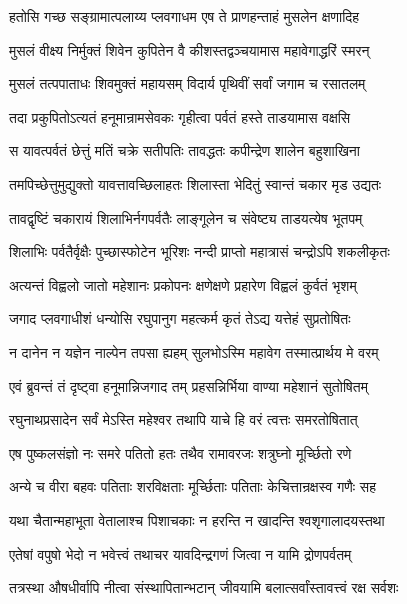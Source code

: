 \twolineshloka
{हतोसि गच्छ सङ्ग्रामात्पलाय्य प्लवगाधम}
{एष ते प्राणहन्ताहं मुसलेन क्षणादिह}%

\twolineshloka
{मुसलं वीक्ष्य निर्मुक्तं शिवेन कुपितेन वै}
{कीशस्तद्वञ्चयामास महावेगाद्धरिं स्मरन्}%

\twolineshloka
{मुसलं तत्पपाताधः शिवमुक्तं महायसम्}
{विदार्य पृथिवीं सर्वां जगाम च रसातलम्}%

\twolineshloka
{तदा प्रकुपितोऽत्यतं हनूमान्रामसेवकः}
{गृहीत्वा पर्वतं हस्ते ताडयामास वक्षसि}%

\twolineshloka
{स यावत्पर्वतं छेत्तुं मतिं चक्रे सतीपतिः}
{तावद्धतः कपीन्द्रेण शालेन बहुशाखिना}%

\twolineshloka
{तमपिच्छेत्तुमुद्युक्तो यावत्तावच्छिलाहतः}
{शिलास्ता भेदितुं स्वान्तं चकार मृड उद्यतः}%

\twolineshloka
{तावद्वृष्टिं चकारायं शिलाभिर्नगपर्वतैः}
{लाङ्गूलेन च संवेष्ट्य ताडयत्येष भूतपम्}%

\twolineshloka
{शिलाभिः पर्वतैर्वृक्षैः पुच्छास्फोटेन भूरिशः}
{नन्दी प्राप्तो महात्रासं चन्द्रोऽपि शकलीकृतः}%

\twolineshloka
{अत्यन्तं विह्वलो जातो महेशानः प्रकोपनः}
{क्षणेक्षणे प्रहारेण विह्वलं कुर्वतं भृशम्}%

\twolineshloka
{जगाद प्लवगाधीशं धन्योसि रघुपानुग}
{महत्कर्म कृतं तेऽद्य यत्तेहं सुप्रतोषितः}%

\twolineshloka
{न दानेन न यज्ञेन नाल्पेन तपसा ह्यहम्}
{सुलभोऽस्मि महावेग तस्मात्प्रार्थय मे वरम्}%


\twolineshloka
{एवं ब्रुवन्तं तं दृष्ट्वा हनूमान्निजगाद तम्}
{प्रहसन्निर्भिया वाण्या महेशानं सुतोषितम्}%


\twolineshloka
{रघुनाथप्रसादेन सर्वं मेऽस्ति महेश्वर}
{तथापि याचे हि वरं त्वत्तः समरतोषितात्}%

\twolineshloka
{एष पुष्कलसंज्ञो नः समरे पतितो हतः}
{तथैव रामावरजः शत्रुघ्नो मूर्च्छितो रणे}%

\twolineshloka
{अन्ये च वीरा बहवः पतिताः शरविक्षताः}
{मूर्च्छिताः पतिताः केचित्तान्रक्षस्व गणैः सह}%

\twolineshloka
{यथा चैतान्महाभूता वेतालाश्च पिशाचकाः}
{न हरन्ति न खादन्ति श्वशृगालादयस्तथा}%

\twolineshloka
{एतेषां वपुषो भेदो न भवेत्त्वं तथाचर}
{यावदिन्द्रगणं जित्वा न यामि द्रोणपर्वतम्}%

\twolineshloka
{तत्रस्था औषधीर्वापि नीत्वा संस्थापितान्भटान्}
{जीवयामि बलात्सर्वांस्तावत्त्वं रक्ष सर्वशः}%

